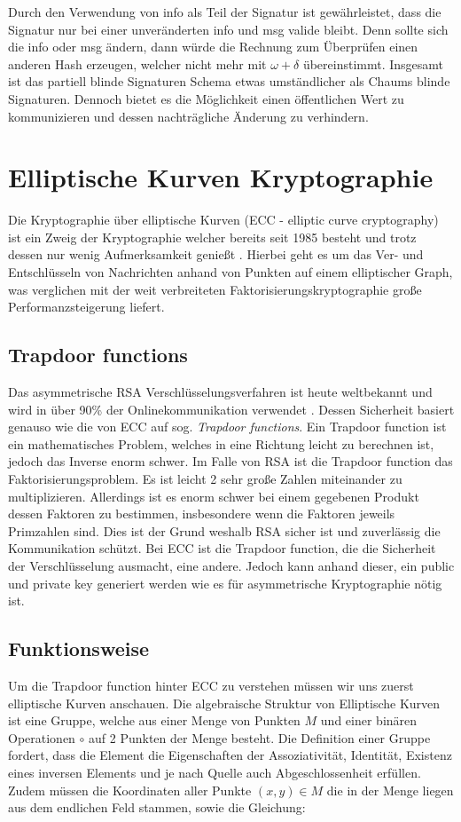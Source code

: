 \documentclass[11pt,a4paper]{scrreprt}
\begin{document}
Durch den Verwendung von info als Teil der Signatur ist gewährleistet, dass die Signatur nur bei einer unveränderten info und msg valide bleibt. Denn sollte sich die info oder msg ändern, dann würde die Rechnung zum Überprüfen einen anderen Hash erzeugen, welcher nicht mehr mit $\omega+\delta$ übereinstimmt. Insgesamt ist das partiell blinde Signaturen Schema etwas umständlicher als Chaums blinde Signaturen. Dennoch bietet es die Möglichkeit einen öffentlichen Wert zu kommunizieren und dessen nachträgliche Änderung zu verhindern.


\section{Elliptische Kurven Kryptographie}
\label{sec:ecc}
Die Kryptographie über elliptische Kurven (ECC - elliptic curve cryptography) ist ein Zweig der Kryptographie welcher bereits seit 1985 besteht \cite{ecc-miller1985use} und trotz dessen nur wenig Aufmerksamkeit genießt . Hierbei geht es um das Ver- und Entschlüsseln von Nachrichten anhand von Punkten auf einem elliptischer Graph, was verglichen mit der weit verbreiteten Faktorisierungskryptographie große Performanzsteigerung liefert.

\subsection{Trapdoor functions}
Das asymmetrische RSA Verschlüsselungsverfahren ist heute weltbekannt und wird in über 90\% der Onlinekommunikation verwendet \cite{ecc-rsa_amount}. Dessen Sicherheit basiert genauso wie die von ECC auf sog.  \textit{Trapdoor functions}. Ein Trapdoor function ist ein mathematisches Problem, welches in eine Richtung leicht zu berechnen ist, jedoch das Inverse enorm schwer. Im Falle von RSA ist die Trapdoor function das Faktorisierungsproblem. Es ist leicht 2 sehr große Zahlen miteinander zu multiplizieren. Allerdings ist es enorm schwer bei einem gegebenen Produkt dessen Faktoren zu bestimmen, insbesondere wenn die Faktoren jeweils Primzahlen sind. Dies ist der Grund weshalb RSA sicher ist und zuverlässig die Kommunikation schützt. Bei ECC ist die Trapdoor function, die die Sicherheit der Verschlüsselung ausmacht, eine andere. Jedoch kann anhand dieser, ein public und private key generiert werden wie es für asymmetrische Kryptographie nötig ist.
\subsection{Funktionsweise}
Um die Trapdoor function hinter ECC zu verstehen müssen wir uns zuerst elliptische Kurven anschauen. Die algebraische Struktur von Elliptische Kurven ist eine Gruppe, welche aus einer Menge von Punkten $M$ und einer binären Operationen $\circ$ auf 2 Punkten der Menge besteht. Die Definition einer Gruppe fordert, dass die Element die Eigenschaften der Assoziativität, Identität, Existenz eines inversen Elements und je nach Quelle auch Abgeschlossenheit erfüllen. \cite{ecc-aradi2016einfuhrung}\cite{ecc-bogopolskij2008introduction} Zudem müssen die Koordinaten aller Punkte $(x,y) \in M$ die in der Menge liegen aus dem endlichen Feld stammen, sowie die Gleichung:
\end{document}
